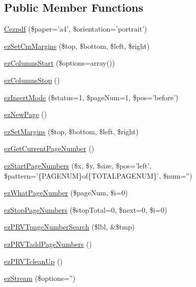 \subsection*{\-Public \-Member \-Functions}
\begin{DoxyCompactItemize}
\item 
\hyperlink{class_cezpdf_aeda57292a0a29314672a7b45b093ba29}{\-Cezpdf} (\$paper='a4', \$orientation='portrait')
\item 
\hyperlink{class_cezpdf_a92b84f95898100139e83d2c2cce86b7f}{ez\-Set\-Cm\-Margins} (\$top, \$bottom, \$left, \$right)
\item 
\hyperlink{class_cezpdf_af0779de4768e53437434c61e88a725d1}{ez\-Columns\-Start} (\$options=array())
\item 
\hyperlink{class_cezpdf_a146a925a5b6775aa5a53cf80d7ee1591}{ez\-Columns\-Stop} ()
\item 
\hyperlink{class_cezpdf_a7321d28d6d613602e4e739fa63da6279}{ez\-Insert\-Mode} (\$status=1, \$page\-Num=1, \$pos='before')
\item 
\hyperlink{class_cezpdf_adf5eb1a9dcd0d1067096273b898ec9f0}{ez\-New\-Page} ()
\item 
\hyperlink{class_cezpdf_a0b5d4a6245514bef019775cd35ad36cf}{ez\-Set\-Margins} (\$top, \$bottom, \$left, \$right)
\item 
\hyperlink{class_cezpdf_adb2e9252531b811d249a8b6dd105ea27}{ez\-Get\-Current\-Page\-Number} ()
\item 
\hyperlink{class_cezpdf_a41d9b5bf85c054f88197a8ea0e721d1b}{ez\-Start\-Page\-Numbers} (\$x, \$y, \$size, \$pos='left', \$pattern='\{\-P\-A\-G\-E\-N\-U\-M\}of\{\-T\-O\-T\-A\-L\-P\-A\-G\-E\-N\-U\-M\}', \$num='')
\item 
\hyperlink{class_cezpdf_a0fa7cc59cbfecab326c120b461bc8f11}{ez\-What\-Page\-Number} (\$page\-Num, \$i=0)
\item 
\hyperlink{class_cezpdf_a77c8952b77276a7c80bd9180c2cdd094}{ez\-Stop\-Page\-Numbers} (\$stop\-Total=0, \$next=0, \$i=0)
\item 
\hyperlink{class_cezpdf_a7aaeab4da47e2bdb2ab4eb7544713bf3}{ez\-P\-R\-V\-Tpage\-Number\-Search} (\$lbl, \&\$tmp)
\item 
\hyperlink{class_cezpdf_a4bfefa5df6b0d2718a69b553e030507e}{ez\-P\-R\-V\-Tadd\-Page\-Numbers} ()
\item 
\hyperlink{class_cezpdf_a60b39bef3ca4083d0df5243518b618a9}{ez\-P\-R\-V\-Tclean\-Up} ()
\item 
\hyperlink{class_cezpdf_afcca993398e4632b77ab2ea658ba7138}{ez\-Stream} (\$options='')
\item 

\end{DoxyCompactItemize}
